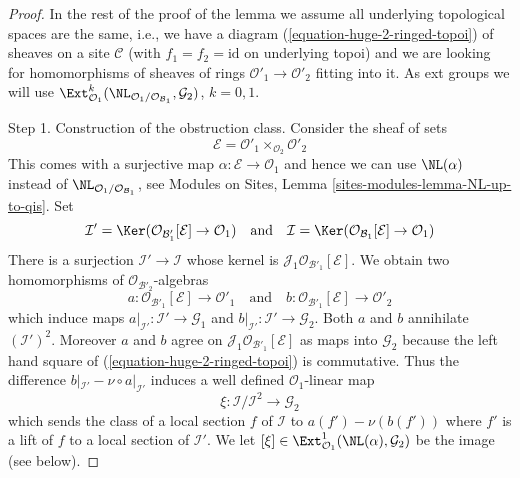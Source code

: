 \begin{proof}
\medskip\noindent
In the rest of the proof of the lemma we assume
all underlying topological spaces are the
same, i.e., we have a diagram (\ref{equation-huge-2-ringed-topoi})
of sheaves on a site $\mathcal{C}$ (with $f_1 = f_2 = \text{id}$
on underlying topoi) and we are looking for
homomorphisms of sheaves of rings
$\mathcal{O}'_1 \to \mathcal{O}'_2$ fitting into it.
As ext groups we will use
$\Ext^k_{\mathcal{O}_1}(
\NL_{\mathcal{O}_1/\mathcal{O}_{\mathcal{B}_1}}, \mathcal{G}_2)$, $k = 0, 1$.

\medskip\noindent
Step 1. Construction of the obstruction class. Consider the sheaf
of sets
$$
\mathcal{E} = \mathcal{O}'_1 \times_{\mathcal{O}_2} \mathcal{O}'_2
$$
This comes with a surjective map $\alpha : \mathcal{E} \to \mathcal{O}_1$
and hence we can use $\NL(\alpha)$ instead of
$\NL_{\mathcal{O}_1/\mathcal{O}_{\mathcal{B}_1}}$, see
Modules on Sites, Lemma \ref{sites-modules-lemma-NL-up-to-qis}.
Set
$$
\mathcal{I}' =
\Ker(\mathcal{O}_{\mathcal{B}'_1}[\mathcal{E}] \to \mathcal{O}_1)
\quad\text{and}\quad
\mathcal{I} =
\Ker(\mathcal{O}_{\mathcal{B}_1}[\mathcal{E}] \to \mathcal{O}_1)
$$
There is a surjection $\mathcal{I}' \to \mathcal{I}$ whose kernel
is $\mathcal{J}_1\mathcal{O}_{\mathcal{B}'_1}[\mathcal{E}]$.
We obtain two homomorphisms of $\mathcal{O}_{\mathcal{B}'_2}$-algebras
$$
a : \mathcal{O}_{\mathcal{B}'_1}[\mathcal{E}] \to \mathcal{O}'_1
\quad\text{and}\quad
b : \mathcal{O}_{\mathcal{B}'_1}[\mathcal{E}] \to \mathcal{O}'_2
$$
which induce maps $a|_{\mathcal{I}'} : \mathcal{I}' \to \mathcal{G}_1$ and
$b|_{\mathcal{I}'} : \mathcal{I}' \to \mathcal{G}_2$. Both $a$ and $b$
annihilate $(\mathcal{I}')^2$. Moreover $a$ and $b$ agree on
$\mathcal{J}_1\mathcal{O}_{\mathcal{B}'_1}[\mathcal{E}]$
as maps into $\mathcal{G}_2$
because the left hand square of (\ref{equation-huge-2-ringed-topoi})
is commutative. Thus the difference
$b|_{\mathcal{I}'} - \nu \circ a|_{\mathcal{I}'}$
induces a well defined $\mathcal{O}_1$-linear map
$$
\xi : \mathcal{I}/\mathcal{I}^2 \longrightarrow \mathcal{G}_2
$$
which sends the class of a local section $f$ of $\mathcal{I}$ to
$a(f') - \nu(b(f'))$ where $f'$ is a lift of $f$ to a local
section of $\mathcal{I}'$. We let
$[\xi] \in \Ext^1_{\mathcal{O}_1}(\NL(\alpha), \mathcal{G}_2)$
be the image (see below).


\end{proof}
